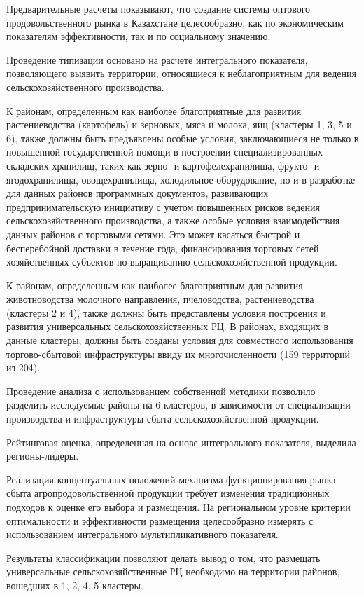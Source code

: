 Предварительные расчеты показывают, что создание системы оптового
продовольственного рынка в Казахстане целесообразно, как по
экономическим показателям эффективности, так и по социальному значению.

Проведение типизации основано на расчете интегрального показателя,
позволяющего выявить территории, относящиеся к неблагоприятным для
ведения сельскохозяйственного производства.

К районам, определенным как наиболее благоприятные для развития
растениеводства (картофель) и зерновых, мяса и молока, яиц (кластеры 1,
3, 5 и 6), также должны быть предъявлены особые условия, заключающиеся
не только в повышенной государственной помощи в построении
специализированных складских хранилищ, таких как зерно- и
картофелехранилища, фрукто- и ягодохранилища, овощехранилища,
холодильное оборудование, но и в разработке для данных районов
программных документов, развивающих предпринимательскую инициативу с
учетом повышенных рисков ведения сельскохозяйственного производства, а
также особые условия взаимодействия данных районов с торговыми сетями.
Это может касаться быстрой и бесперебойной доставки в течение года,
финансирования торговых сетей хозяйственных субъектов по выращиванию
сельскохозяйственной продукции.

К районам, определенным как наиболее благоприятным для развития
животноводства молочного направления, пчеловодства, растениеводства
(кластеры 2 и 4), также должны быть представлены условия построения и
развития универсальных сельскохозяйственных РЦ. В районах, входящих в
данные кластеры, должны быть созданы условия для совместного
использования торгово-сбытовой инфраструктуры ввиду их многочисленности
(159 территорий из 204).

Проведение анализа с использованием собственной методики позволило
разделить исследуемые районы на 6 кластеров, в зависимости от
специализации производства и инфраструктуры сбыта сельскохозяйственной
продукции.

Рейтинговая оценка, определенная на основе интегрального показателя,
выделила регионы-лидеры.

Реализация концептуальных положений механизма функционирования рынка
сбыта агропродовольственной продукции требует изменения традиционных
подходов к оценке его выбора и размещения. На региональном уровне
критерии оптимальности и эффективности размещения целесообразно измерять
с использованием интегрального мультипликативного показателя.

Результаты классификации позволяют делать вывод о том, что размещать
универсальные сельскохозяйственные РЦ необходимо на территории районов,
вошедших в 1, 2, 4, 5 кластеры.

